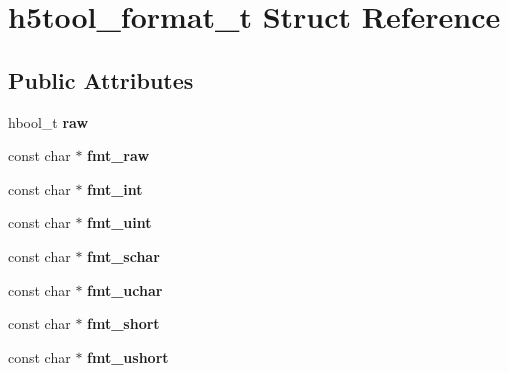 \hypertarget{structh5tool__format__t}{}\section{h5tool\+\_\+format\+\_\+t Struct Reference}
\label{structh5tool__format__t}
\subsection*{Public Attributes}
\begin{DoxyCompactItemize}
\item 
\mbox{\label{structh5tool__format__t_a80d3ecf4ec9cf5f28d1430ed48754de2}} 
hbool\+\_\+t {\bfseries raw}
\item 
\mbox{\label{structh5tool__format__t_a3854e4cc464812369f58c44f12159cab}} 
const char $\ast$ {\bfseries fmt\+\_\+raw}
\item 
\mbox{\label{structh5tool__format__t_a6570d8470ff810580279a30319a752c2}} 
const char $\ast$ {\bfseries fmt\+\_\+int}
\item 
\mbox{\label{structh5tool__format__t_a8e45dee2a78b9976acd4c631f4c2e8cf}} 
const char $\ast$ {\bfseries fmt\+\_\+uint}
\item 
\mbox{\label{structh5tool__format__t_a2334b87a9b84a54b79437f56fe19024b}} 
const char $\ast$ {\bfseries fmt\+\_\+schar}
\item 
\mbox{\label{structh5tool__format__t_a601b6d4c69a5c198cf2610ea1551dc4c}} 
const char $\ast$ {\bfseries fmt\+\_\+uchar}
\item 
\mbox{\label{structh5tool__format__t_a7bfa488f1de934d5f8058d2c637caf39}} 
const char $\ast$ {\bfseries fmt\+\_\+short}
\item 
\mbox{\label{structh5tool__format__t_a9eaaa5e56b2b88cb900204c3b69853cb}} 
const char $\ast$ {\bfseries fmt\+\_\+ushort}
\item 
\mbox{\label{structh5tool__format__t_a60d55b07e4b1180e120bd630eacb222f}} 

\end{DoxyCompactItemize}
